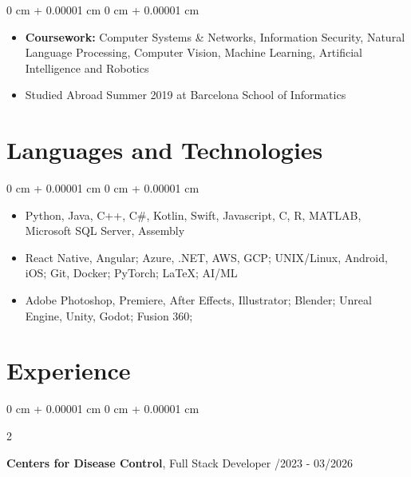 \documentclass[10pt, letterpaper]{article}
\newenvironment{highlights}{
    \begin{itemize}[
        topsep=0.10 cm,
        parsep=0.10 cm,
        partopsep=0pt,
        itemsep=0pt,
        leftmargin=0 cm + 10pt
    ]
}{
    \end{itemize}
} %
\newenvironment{highlightsforbulletentries}{
    \begin{itemize}[
        topsep=0.10 cm,
        parsep=0.10 cm,
        partopsep=0pt,
        itemsep=0pt,
        leftmargin=10pt
    ]
}{
    \end{itemize}
} %
\newenvironment{onecolentry}{
    \begin{adjustwidth}{
        0 cm + 0.00001 cm
    }{
        0 cm + 0.00001 cm
    }
}{
    \end{adjustwidth}
} %
\newenvironment{twocolentry}[2][]{
    \onecolentry
    \def\secondColumn{#2}
    \setcolumnwidth{\fill, 4.5 cm}
    \begin{paracol}{2}
}{
    \switchcolumn \raggedleft \secondColumn
    \end{paracol}
    \endonecolentry
} %
\begin{document}
        \vspace{0.10 cm}
        \begin{onecolentry}
            \begin{highlights}
                \item \textbf{Coursework:} Computer Systems \& Networks, Information Security, Natural Language Processing, Computer Vision, Machine Learning, Artificial Intelligence and Robotics
                \item Studied Abroad Summer 2019 at Barcelona School of Informatics
            \end{highlights}
        \end{onecolentry}

    \section{Languages and Technologies}

        \begin{onecolentry}
            \begin{highlightsforbulletentries}
            
            \item Python, Java, C++, C\#, Kotlin, Swift, Javascript, C, R, MATLAB, Microsoft SQL Server, Assembly
    
            \item React Native, Angular; Azure, .NET, AWS, GCP; UNIX/Linux, Android, iOS; Git, Docker; PyTorch; LaTeX; AI/ML
    
            \item Adobe Photoshop, Premiere, After Effects, Illustrator; Blender; Unreal Engine, Unity, Godot; Fusion 360;
    
            \end{highlightsforbulletentries}
        \end{onecolentry}

    
    \section{Experience}
        \vspace{0.05 cm}
        \begin{twocolentry}{
            11/2023 - 03/2026
        }
            \textbf{Centers for Disease Control}, Full Stack Developer\end{twocolentry}
\end{document}
